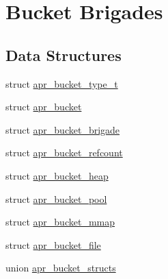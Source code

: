 \hypertarget{group___a_p_r___util___bucket___brigades}{\section{Bucket Brigades}
\label{group___a_p_r___util___bucket___brigades}
}
\subsection*{Data Structures}
\begin{DoxyCompactItemize}
\item 
struct \hyperlink{structapr__bucket__type__t}{apr\-\_\-bucket\-\_\-type\-\_\-t}
\item 
struct \hyperlink{structapr__bucket}{apr\-\_\-bucket}
\item 
struct \hyperlink{structapr__bucket__brigade}{apr\-\_\-bucket\-\_\-brigade}
\item 
struct \hyperlink{structapr__bucket__refcount}{apr\-\_\-bucket\-\_\-refcount}
\item 
struct \hyperlink{structapr__bucket__heap}{apr\-\_\-bucket\-\_\-heap}
\item 
struct \hyperlink{structapr__bucket__pool}{apr\-\_\-bucket\-\_\-pool}
\item 
struct \hyperlink{structapr__bucket__mmap}{apr\-\_\-bucket\-\_\-mmap}
\item 
struct \hyperlink{structapr__bucket__file}{apr\-\_\-bucket\-\_\-file}
\item 
union \hyperlink{unionapr__bucket__structs}{apr\-\_\-bucket\-\_\-structs}
\end{DoxyCompactItemize}
